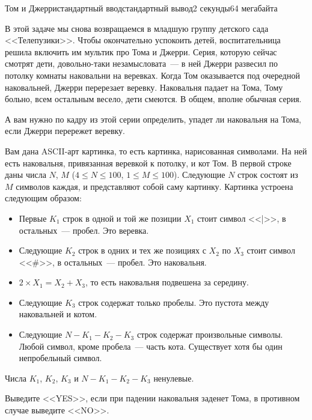\begin{problem}{Том и Джерри}{стандартный ввод}{стандартный вывод}{2 секунды}{64 мегабайта}

В этой задаче мы снова возвращаемся в младшую группу детского сада <<Телепузики>>. Чтобы окончательно успокоить детей, воспитательница решила включить им мультик про Тома и Джерри. Серия, которую сейчас смотрят дети, довольно-таки незамысловата~--- в ней Джерри развесил по потолку комнаты наковальни на веревках. Когда Том оказывается под очередной наковальней, Джерри перерезает веревку. Наковальня падает на Тома, Тому больно, всем остальным весело, дети смеются. В общем, вполне обычная серия.

А вам нужно по кадру из этой серии определить, упадет ли наковальня на Тома, если Джерри перережет веревку.


\InputFile
Вам дана ASCII-арт картинка, то есть картинка, нарисованная символами. На ней есть наковальня, привязанная веревкой к потолку, и кот Том. 
В первой строке даны числа $N$, $M$ ($4 \leqslant N \leqslant 100$, $1 \leqslant M \leqslant 100$).
Следующие $N$ строк состоят из $M$ символов каждая, и представляют собой саму картинку. 
Картинка устроена следующим образом:
\begin{itemize}
\item Первые $K_1$ строк в одной и той же позиции $X_1$ стоит символ <<|>>, в остальных~--- пробел. Это веревка.
\item Следующие $K_2$ строк в одних и тех же позициях с $X_2$ по $X_3$ стоит символ <<\#>>, в остальных~--- пробел. Это наковальня.
\item $2 \times X_1 = X_2 + X_3$, то есть наковальня подвешена за середину.
\item Следующие $K_3$ строк содержат только пробелы. Это пустота между наковальней и котом.
\item Следующие $N - K_1 - K_2 - K_3$ строк содержат произвольные символы. Любой символ, кроме пробела~--- часть кота. Существует хотя бы один непробельный символ.
\end{itemize}
Числа $K_1$, $K_2$, $K_3$ и $N - K_1 - K_2 - K_3$ ненулевые.

\OutputFile
Выведите <<YES>>, если при падении наковальня заденет Тома, в противном случае выведите <<NO>>.

\Examples


\end{problem}
